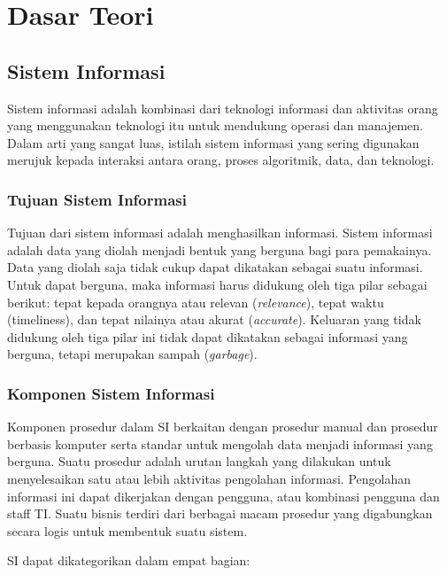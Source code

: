 \chapter{Dasar Teori}
\label{chap: dasarTeori}

\section{Sistem Informasi}
\label{sec: sistemInformasi}

	Sistem informasi adalah kombinasi dari teknologi informasi dan aktivitas orang yang menggunakan teknologi itu untuk mendukung operasi dan manajemen. Dalam arti yang sangat luas, istilah sistem informasi yang sering digunakan merujuk kepada interaksi antara orang, proses algoritmik, data, dan teknologi. 
	
	\subsection{Tujuan Sistem Informasi}
	\label{sub: tujuanSI}
	
		Tujuan dari sistem informasi adalah menghasilkan informasi. Sistem informasi adalah data yang diolah menjadi bentuk yang berguna bagi para pemakainya. Data yang diolah saja tidak cukup dapat dikatakan sebagai suatu informasi. Untuk dapat berguna, maka informasi harus didukung oleh tiga pilar sebagai berikut: tepat kepada orangnya atau relevan (\textit{relevance}), tepat waktu (timeliness), dan tepat nilainya atau akurat (\textit{accurate}). Keluaran yang tidak didukung oleh tiga pilar ini tidak dapat dikatakan sebagai informasi yang berguna, tetapi merupakan sampah (\textit{garbage}).
	
	\subsection{Komponen Sistem Informasi}
	\label{sub: komponenSI}
	
		Komponen prosedur dalam SI berkaitan dengan prosedur manual dan prosedur berbasis komputer serta standar untuk mengolah data menjadi informasi yang berguna. Suatu prosedur adalah urutan langkah yang dilakukan untuk menyelesaikan satu atau lebih aktivitas pengolahan informasi. Pengolahan informasi ini dapat dikerjakan dengan pengguna, atau kombinasi pengguna dan staff TI. Suatu bisnis terdiri dari berbagai macam prosedur yang digabungkan secara logis untuk membentuk suatu sistem. 
		
		SI dapat dikategorikan dalam empat bagian:
		
